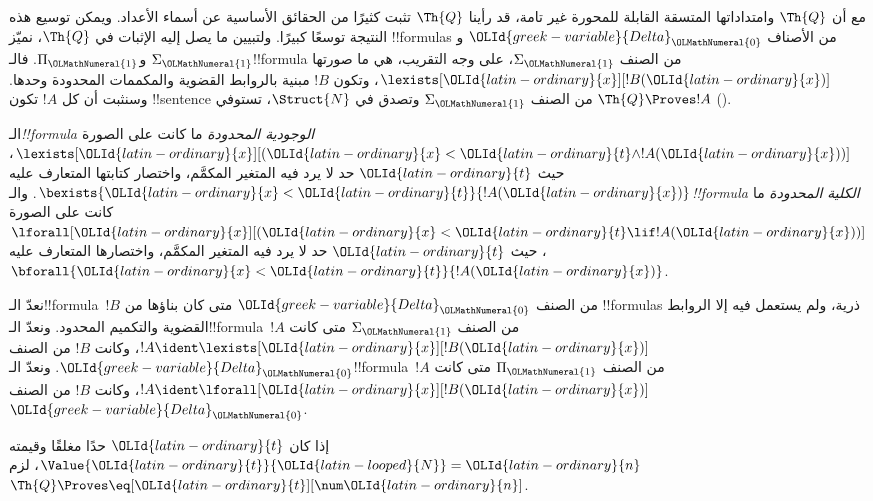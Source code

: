 \documentclass[../../../include/open-logic-section]{subfiles}
\begin{document}

مع أن $\Th{Q}$ وامتداداتها المتسقة القابلة للمحورة غير تامة،
قد رأينا $\Th{Q}$ تثبت كثيرًا من الحقائق الأساسية عن أسماء الأعداد.
ويمكن توسيع هذه النتيجة توسعًا كبيرًا. ولتبيين ما يصل إليه الإثبات في
$\Th{Q}$، نميّز !!{formula}s من الأصناف $\OLId{greek-variable}{Delta}_\OLMathNumeral{0}$ و
$\Sigma_\OLMathNumeral{1}$ و$\Pi_\OLMathNumeral{1}$.
فالـ!!{formula} من الصنف $\Sigma_\OLMathNumeral{1}$، على وجه التقريب،
هي ما صورتها $\lexists[\OLId{latin-ordinary}{x}][!B(\OLId{latin-ordinary}{x})]$، وتكون $!B$ مبنية بالروابط القضوية
والمكممات المحدودة وحدها. وسنثبت أن كل $!A$ تكون !!{sentence}
من الصنف $\Sigma_\OLMathNumeral{1}$ وتصدق في $\Struct{N}$،
تستوفي $\Th{Q}\Proves !A$ ().

\begin{defn}
الـ\emph{!!{formula} الوجودية المحدودة} ما كانت على الصورة
$\lexists[\OLId{latin-ordinary}{x}][(\OLId{latin-ordinary}{x}<\OLId{latin-ordinary}{t}\land !A(\OLId{latin-ordinary}{x}))]$، حيث $\OLId{latin-ordinary}{t}$ حد لا يرد فيه المتغير المكمَّم،
واختصار كتابتها المتعارف عليه $\bexists{\OLId{latin-ordinary}{x}<\OLId{latin-ordinary}{t}}{!A(\OLId{latin-ordinary}{x})}$.
%
والـ\emph{!!{formula} الكلية المحدودة} ما كانت على الصورة
$\lforall[\OLId{latin-ordinary}{x}][(\OLId{latin-ordinary}{x}<\OLId{latin-ordinary}{t}\lif !A(\OLId{latin-ordinary}{x}))]$، حيث $\OLId{latin-ordinary}{t}$ حد لا يرد فيه المتغير المكمَّم،
واختصارها المتعارف عليه $\bforall{\OLId{latin-ordinary}{x}<\OLId{latin-ordinary}{t}}{!A(\OLId{latin-ordinary}{x})}$.
\end{defn}

\begin{defn}
نعدّ الـ!!{formula}~$!B$ من الصنف $\OLId{greek-variable}{Delta}_\OLMathNumeral{0}$ متى كان بناؤها من
!!{formula}s ذرية، ولم يستعمل فيه إلا الروابط القضوية والتكميم المحدود.
%
ونعدّ الـ!!{formula}~$!A$ من الصنف $\Sigma_\OLMathNumeral{1}$ متى كانت
$!A\ident\lexists[\OLId{latin-ordinary}{x}][!B(\OLId{latin-ordinary}{x})]$، وكانت $!B$ من الصنف $\OLId{greek-variable}{Delta}_\OLMathNumeral{0}$.
%
ونعدّ الـ!!{formula}~$!A$ من الصنف $\Pi_\OLMathNumeral{1}$ متى كانت
$!A\ident\lforall[\OLId{latin-ordinary}{x}][!B(\OLId{latin-ordinary}{x})]$، وكانت $!B$ من الصنف $\OLId{greek-variable}{Delta}_\OLMathNumeral{0}$.
\end{defn}

\begin{lem}
 إذا كان $\OLId{latin-ordinary}{t}$ حدًا مغلقًا وقيمته
$\Value{\OLId{latin-ordinary}{t}}{\OLId{latin-looped}{N}}=\OLId{latin-ordinary}{n}$، لزم $\Th{Q}\Proves\eq[\OLId{latin-ordinary}{t}][\num \OLId{latin-ordinary}{n}]$.
\end{lem}
\end{document}
